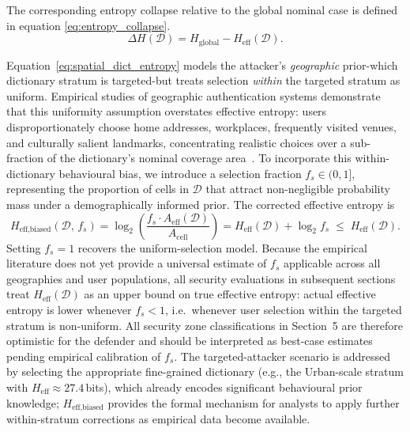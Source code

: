 \documentclass[journal,article,submit,pdftex,moreauthors]{Definitions/mdpi}
\newcommand{\add}[1]{#1}
\newcommand{\add}[1]{\added{#1}}
\begin{document}
The corresponding entropy collapse relative to the global nominal case is defined in equation \ref{eq:entropy_collapse}.
\begin{equation}
\Delta H(\mathcal{D}) = H_{\text{global}} - H_{\text{eff}}(\mathcal{D}).
\label{eq:entropy_collapse}
\end{equation}

\add{Equation~\ref{eq:spatial_dict_entropy} models the attacker's \emph{geographic} prior-which dictionary stratum is targeted-but treats selection \emph{within} the targeted stratum as uniform. Empirical studies of geographic authentication systems demonstrate that this uniformity assumption overstates effective entropy: users disproportionately choose home addresses, workplaces, frequently visited venues, and culturally salient landmarks, concentrating realistic choices over a sub-fraction of the dictionary's nominal coverage area~\cite{Sun2012,Thorpe2013,AlAmeen2014}. To incorporate this within-dictionary behavioural bias, we introduce a selection fraction $f_s \in (0,1]$, representing the proportion of cells in $\mathcal{D}$ that attract non-negligible probability mass under a demographically informed prior. The corrected effective entropy is
\begin{equation}
H_{\text{eff,biased}}(\mathcal{D},\,f_s)
  = \log_2\!\left(\frac{f_s \cdot A_{\text{eff}}(\mathcal{D})}{A_{\text{cell}}}\right)
  = H_{\text{eff}}(\mathcal{D}) + \log_2 f_s \;\leq\; H_{\text{eff}}(\mathcal{D}).
\label{eq:biased_entropy}
\end{equation}
Setting $f_s = 1$ recovers the uniform-selection model. Because the empirical literature does not yet provide a universal estimate of $f_s$ applicable across all geographies and user populations, all security evaluations in subsequent sections treat $H_{\text{eff}}(\mathcal{D})$ as an upper bound on true effective entropy: actual effective entropy is lower whenever $f_s < 1$, i.e.\ whenever user selection within the targeted stratum is non-uniform. All security zone classifications in Section~5 are therefore optimistic for the defender and should be interpreted as best-case estimates pending empirical calibration of $f_s$. The targeted-attacker scenario is addressed by selecting the appropriate fine-grained dictionary (e.g., the Urban-scale stratum with $H_{\text{eff}} \approx 27.4$\,bits), which already encodes significant behavioural prior knowledge; $H_{\text{eff,biased}}$ provides the formal mechanism for analysts to apply further within-stratum corrections as empirical data become available.}
\end{document}
